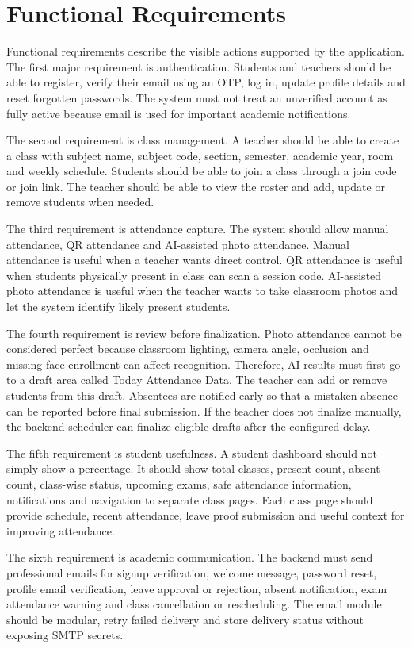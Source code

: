 \section{Functional Requirements}

Functional requirements describe the visible actions supported by the application. The first major requirement is authentication. Students and teachers should be able to register, verify their email using an OTP, log in, update profile details and reset forgotten passwords. The system must not treat an unverified account as fully active because email is used for important academic notifications.

The second requirement is class management. A teacher should be able to create a class with subject name, subject code, section, semester, academic year, room and weekly schedule. Students should be able to join a class through a join code or join link. The teacher should be able to view the roster and add, update or remove students when needed.

The third requirement is attendance capture. The system should allow manual attendance, QR attendance and AI-assisted photo attendance. Manual attendance is useful when a teacher wants direct control. QR attendance is useful when students physically present in class can scan a session code. AI-assisted photo attendance is useful when the teacher wants to take classroom photos and let the system identify likely present students.

The fourth requirement is review before finalization. Photo attendance cannot be considered perfect because classroom lighting, camera angle, occlusion and missing face enrollment can affect recognition. Therefore, AI results must first go to a draft area called Today Attendance Data. The teacher can add or remove students from this draft. Absentees are notified early so that a mistaken absence can be reported before final submission. If the teacher does not finalize manually, the backend scheduler can finalize eligible drafts after the configured delay.

The fifth requirement is student usefulness. A student dashboard should not simply show a percentage. It should show total classes, present count, absent count, class-wise status, upcoming exams, safe attendance information, notifications and navigation to separate class pages. Each class page should provide schedule, recent attendance, leave proof submission and useful context for improving attendance.

The sixth requirement is academic communication. The backend must send professional emails for signup verification, welcome message, password reset, profile email verification, leave approval or rejection, absent notification, exam attendance warning and class cancellation or rescheduling. The email module should be modular, retry failed delivery and store delivery status without exposing SMTP secrets.


